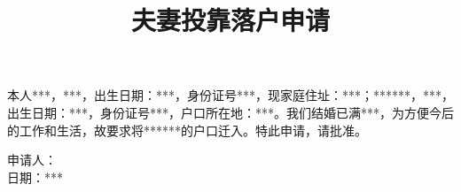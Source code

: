 \documentclass[12pt,a4paper]{article}
\author{}
\title{夫妻投靠落户申请}
\date{\vspace{-10ex}}
\newcommand{\applicantName}{***}
\newcommand{\applicantSex}{***}
\newcommand{\applicantBirthday}{***}
\newcommand{\applicantIDCardNo}{***}
\newcommand{\applicantResidentAddress}{***}
\newcommand{\spouseRole}{***}
\newcommand{\spouseName}{***}
\newcommand{\spouseSex}{***}
\newcommand{\spouseBirthday}{***}
\newcommand{\spouseIDCardNo}{***}
\newcommand{\spouseResidentAddress}{***}
\newcommand{\applicationDate}{***}
\newcommand{\applicationMinimumTime}{***}
\begin{document}
\maketitle
\thispagestyle{empty}
本人\applicantName，\applicantSex，出生日期：\applicantBirthday，身份证号\applicantIDCardNo，现家庭住址：\applicantResidentAddress；\spouseRole\spouseName，\spouseSex，出生日期：\spouseBirthday，身份证号\spouseIDCardNo，户口所在地：\spouseResidentAddress。我们结婚已满\applicationMinimumTime，为方便今后的工作和生活，故要求将\spouseRole\spouseName 的户口迁入。特此申请，请批准。
\begin{flushright}
申请人：　　　　　　\\
日期：\applicationDate
\end{flushright}
\end{document}
